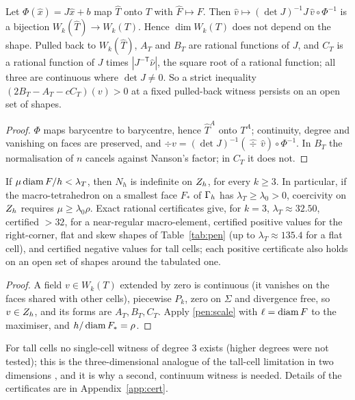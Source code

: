\begin{lemma}\label{pen:piola}
Let $\Phi(\hat x)=J\hat x+b$ map $\hat T$ onto $T$ with $\hat F\mapsto F$. Then $\hat v\mapsto(\det J)^{-1}J\,\hat v\circ\Phi^{-1}$ is a bijection $W_k(\hat T)\to W_k(T)$. Hence $\dim W_k(T)$ does not depend on the shape. Pulled back to $W_k(\hat T)$, $A_T$ and $B_T$ are rational functions of $J$, and $C_T$ is a rational function of $J$ times $|J^{-\mathsf T}\hat\nu|$, the square root of a rational function; all three are continuous where $\det J\ne0$. So a strict inequality $(2B_T-A_T-cC_T)(v)>0$ at a fixed pulled-back witness persists on an open set of shapes.
\end{lemma}

\begin{proof}
$\Phi$ maps barycentre to barycentre, hence $\hat T^A$ onto $T^A$; continuity, degree and vanishing on faces are preserved, and $\div v=(\det J)^{-1}(\widehat\div\,\hat v)\circ\Phi^{-1}$. In $B_T$ the normalisation of $n$ cancels against Nanson's factor; in $C_T$ it does not.
\end{proof}

\begin{theorem}\label{pen:single}
If $\mu\operatorname{diam} F/h<\lambda_T$, then $N_h$ is indefinite on $Z_h$, for every $k\ge3$. In particular, if the macro-tetrahedron on a smallest face $F_\ast$ of $\Gamma_h$ has $\lambda_T\ge\lambda_0>0$, coercivity on $Z_h$ requires $\mu\ge\lambda_0\rho$. Exact rational certificates give, for $k=3$, $\lambda_T\approx32.50$, certified $>32$, for a near-regular macro-element, certified positive values for the right-corner, flat and skew shapes of Table~\ref{tab:pen} (up to $\lambda_T\approx135.4$ for a flat cell), and certified negative values for tall cells; each positive certificate also holds on an open set of shapes around the tabulated one. 
\end{theorem}

\begin{proof}
A field $v\in W_k(T)$ extended by zero is continuous (it vanishes on the faces shared with other cells), piecewise $P_k$, zero on $\Sigma$ and divergence free, so $v\in Z_h$, and its forms are $A_T,B_T,C_T$. Apply \eqref{pen:scale} with $\ell=\operatorname{diam} F$ to the maximiser, and $h/\operatorname{diam} F_\ast=\rho$.
\end{proof}
For tall cells no single-cell witness of degree $3$ exists (higher degrees were not tested); this is the three-dimensional analogue of the tall-cell limitation in two dimensions \cite{PadhiLong2D}, and it is why a second, continuum witness is needed. Details of the certificates are in Appendix~\ref{app:cert}.

